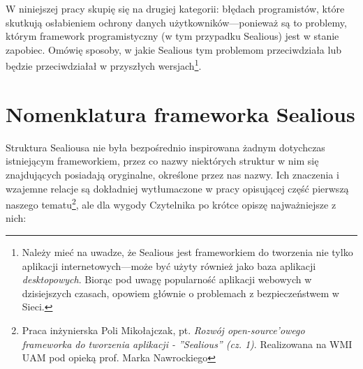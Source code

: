 \documentclass[12pt,polish,a4paper,]{report}
\begin{document}
W niniejszej pracy skupię się na drugiej kategorii: błędach
programistów, które skutkują osłabieniem ochrony danych
użytkowników---ponieważ są to problemy, którym framework programistyczny
(w tym przypadku Sealious) jest w stanie zapobiec. Omówię sposoby, w
jakie Sealious tym problemom przeciwdziała lub będzie przeciwdziałał w
przyszłych wersjach\footnote{Należy mieć na uwadze, że Sealious jest
  frameworkiem do tworzenia nie tylko aplikacji internetowych---może być
  użyty również jako baza aplikacji \emph{desktopowych}. Biorąc pod
  uwagę popularność aplikacji webowych w dzisiejszych czasach, opowiem
  głównie o problemach z bezpieczeństwem w Sieci.}.

\chapter*{Nomenklatura frameworka
Sealious}\label{nomenklatura-frameworka-sealious}

Struktura Sealiousa nie była bezpośrednio inspirowana żadnym dotychczas
istniejącym frameworkiem, przez co nazwy niektórych struktur w nim się
znajdujących posiadają oryginalne, określone przez nas nazwy. Ich
znaczenia i wzajemne relacje są dokładniej wytłumaczone w pracy
opisującej część pierwszą naszego tematu\footnote{Praca inżynierska Poli
  Mikołajczak, pt. \emph{Rozwój open-source'owego frameworka do
  tworzenia aplikacji - ''Sealious'' (cz. 1)}. Realizowana na WMI UAM
  pod opieką prof. Marka Nawrockiego}, ale dla wygody Czytelnika po
krótce opiszę najważniejsze z nich:
\end{document}
